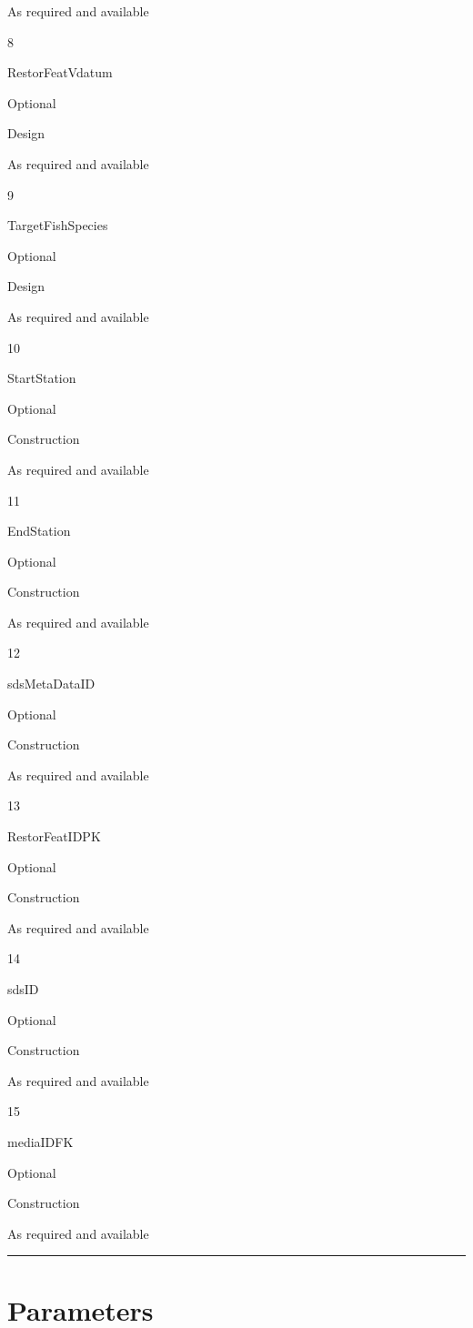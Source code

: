\documentclass[
  letterpaper,
  DIV=11,
  numbers=noendperiod]{scrreprt}
\begin{document}
As required and available

8

RestorFeatVdatum

Optional

Design

As required and available

9

TargetFishSpecies

Optional

Design

As required and available

10

StartStation

Optional

Construction

As required and available

11

EndStation

Optional

Construction

As required and available

12

sdsMetaDataID

Optional

Construction

As required and available

13

RestorFeatIDPK

Optional

Construction

As required and available

14

sdsID

Optional

Construction

As required and available

15

mediaIDFK

Optional

Construction

As required and available

\begin{center}\rule{0.5\linewidth}{0.5pt}\end{center}

\section{Parameters}\label{parameters-3}
\end{document}
